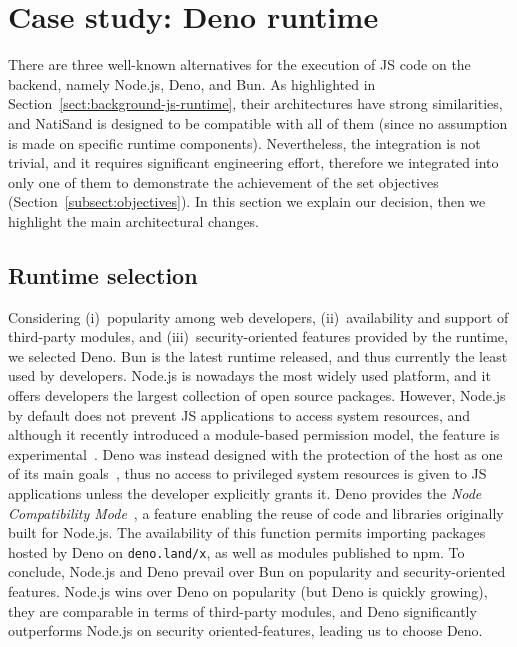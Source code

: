 \section{Case study: Deno runtime}
\label{sect:case-study-deno}

There are three well-known alternatives for the execution of JS code
on the backend, namely Node.js, Deno, and Bun. As highlighted in
Section~\ref{sect:background-js-runtime}, their architectures have
strong similarities, and NatiSand is designed to be compatible with
all of them (since no assumption is made on specific runtime
components). Nevertheless, the integration is not trivial, and it requires
significant engineering effort, therefore we integrated \natisand into only
one of them to demonstrate the achievement of the set objectives
(Section~\ref{subsect:objectives}). In this section we explain our
decision, then we highlight the main architectural changes.

\subsection{Runtime selection}
\label{sect:deno-selection}

Considering (i)~popularity among web developers, (ii)~availability and
support of third-party modules, and (iii)~security-oriented features
provided by the runtime, we selected Deno. Bun is the latest runtime
released, and thus currently the least used by developers. Node.js is nowadays the most
widely used platform, and it offers developers the largest collection
of open source packages. However, Node.js by default does not prevent
JS applications to access system resources, and although it
recently introduced a module-based permission model, the feature is
experimental~\cite{node-permissions}. Deno was instead designed with the protection of
the host as one of its main goals~\cite{nodejs-regret}, thus no access to privileged system
resources is given to JS applications unless the developer
explicitly grants it. Deno provides the
{\em Node Compatibility Mode}~\cite{deno-compatibility-mode}, a
feature enabling the reuse of
code and libraries originally built for Node.js. The availability of
this function permits importing packages hosted by Deno on {\tt deno.land/x}, as well as
modules published to npm. To conclude, Node.js and Deno prevail
over Bun on popularity and security-oriented features. Node.js wins over Deno on
popularity (but Deno is quickly growing), they are comparable in terms
of third-party modules, and Deno significantly outperforms Node.js on
security oriented-features, leading us to choose Deno.

